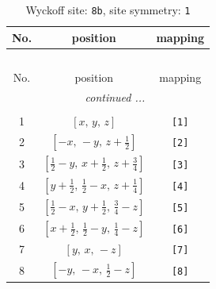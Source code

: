 \documentclass[fleqn,8pt]{jsarticle}
\begin{document}
\begin{longtable}{ccc}
\caption{Wyckoff site: {\tt 8b}, site symmetry: {\tt 1}}
 \\
 \hline \hline
No. & position & mapping \\ \hline \endfirsthead

\multicolumn{2}{l}{\tablename\ \thetable{}} \\
 \hline \hline
No. & position & mapping \\ \hline \endhead

 \hline \hline
\multicolumn{2}{r}{\footnotesize\it continued ...} \\ \endfoot

 \hline \hline
\multicolumn{2}{r}{} \\ \endlastfoot

1 & $\left[ x,\, y,\, z \right]$ & {\tt [1]} \\ \hline
2 & $\left[ - x,\, - y,\, z + \frac{1}{2} \right]$ & {\tt [2]} \\ \hline
3 & $\left[ \frac{1}{2} - y,\, x + \frac{1}{2},\, z + \frac{3}{4} \right]$ & {\tt [3]} \\ \hline
4 & $\left[ y + \frac{1}{2},\, \frac{1}{2} - x,\, z + \frac{1}{4} \right]$ & {\tt [4]} \\ \hline
5 & $\left[ \frac{1}{2} - x,\, y + \frac{1}{2},\, \frac{3}{4} - z \right]$ & {\tt [5]} \\ \hline
6 & $\left[ x + \frac{1}{2},\, \frac{1}{2} - y,\, \frac{1}{4} - z \right]$ & {\tt [6]} \\ \hline
7 & $\left[ y,\, x,\, - z \right]$ & {\tt [7]} \\ \hline
8 & $\left[ - y,\, - x,\, \frac{1}{2} - z \right]$ & {\tt [8]} \\
\end{longtable}
\end{document}
